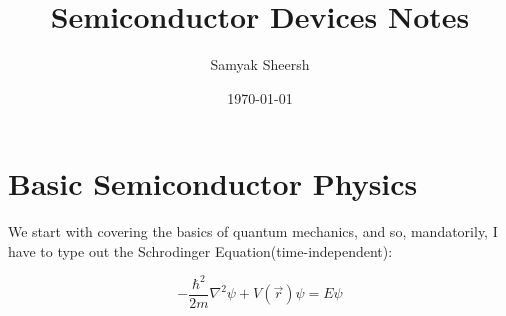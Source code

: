 \documentclass[12pt]{article}
\author{Samyak Sheersh}
\date{\today}
\title{Semiconductor Devices Notes}
\begin{document}
\maketitle
\tableofcontents

\section{Basic Semiconductor Physics}
We start with covering the basics of quantum mechanics, and so, mandatorily, I have to type out the Schrodinger Equation(time-independent):

\begin{equation}
    -\frac{\hbar^2}{2m}\nabla^2 \psi +V(\vec{r})\psi = E\psi
\end{equation}
\end{document}
